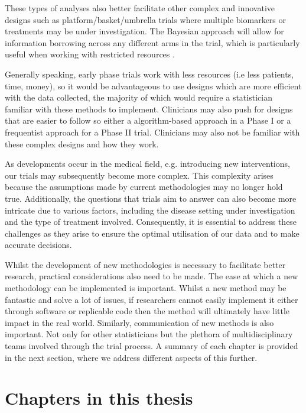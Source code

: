 These types of analyses also better facilitate other complex and innovative designs such as platform/basket/umbrella trials where multiple biomarkers or treatments may be under investigation. The Bayesian approach will allow for information borrowing across any different arms in the trial, which is particularly useful when working with restricted resources \cite{carlinBayesianComplexInnovative2022}. 

Generally speaking, early phase trials work with less resources (i.e less patients, time, money), so it would be advantageous to use designs which are more efficient with the data collected, the majority of which would require a statistician familiar with these methods to implement. Clinicians may also push for designs that are easier to follow so either a algorithm-based approach in a Phase \RN{1} or a frequentist approach for a Phase \RN{2} trial. Clinicians may also not be familiar with these complex designs and how they work. 

As developments occur in the medical field, e.g. introducing new interventions, our trials may subsequently become more complex.  This complexity arises because the assumptions made by current methodologies may no longer hold true. Additionally, the questions that trials aim to answer can also become more intricate due to various factors, including the disease setting under investigation and the type of treatment involved. Consequently, it is essential to address these challenges as they arise to ensure the optimal utilisation of our data and to make accurate decisions. 

Whilst the development of new methodologies is necessary to facilitate better research, practical considerations also need to be made. The ease at which a new methodology can be implemented is important. Whilst a new method may be fantastic and solve a lot of issues, if researchers cannot easily implement it either through software or replicable code then the method will ultimately have little impact in the real world. Similarly, communication of new methods is also important. Not only for other statisticians but the plethora of multidisciplinary teams involved through the trial process. A summary of each chapter is provided in the next section, where we address different aspects of this further. 
\section{Chapters in this thesis}

